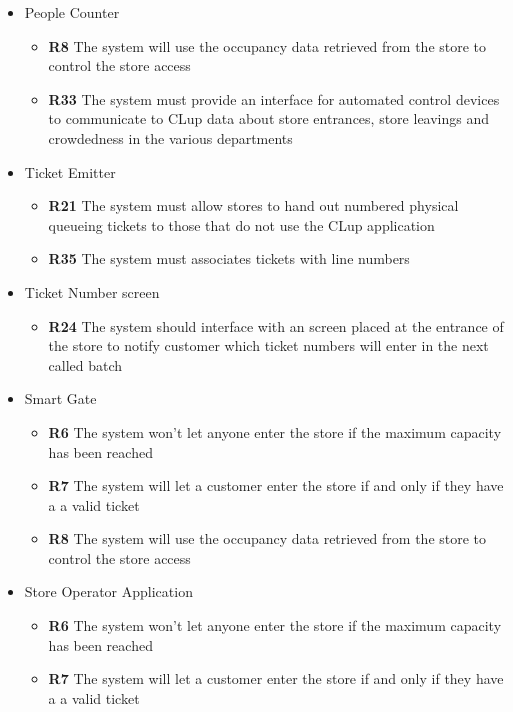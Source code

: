 \begin{itemize}
\begin{itemize}
    \end{itemize}
    \item People Counter
    \begin{itemize}
        \item \textbf{R8} The system will use the occupancy data retrieved from the store to control the store access
        \item \textbf{R33} The system must provide an interface for automated control devices to communicate to CLup data about store entrances, store leavings and crowdedness in the various departments
    \end{itemize}
    \item Ticket Emitter
    \begin{itemize}
        \item \textbf{R21} The system must allow stores to hand out numbered physical queueing tickets to those that do not use the CLup application
        \item \textbf{R35} The system must associates tickets with line numbers
    \end{itemize}
    \item Ticket Number screen
    \begin{itemize}
        \item \textbf{R24} The system should interface with an screen placed at the entrance of the store to notify customer which ticket numbers will enter in the next called batch
    \end{itemize}
    \item Smart Gate
    \begin{itemize}
        \item \textbf{R6} The system won’t let anyone enter the store if the maximum capacity has been reached
        \item \textbf{R7} The system will let a customer enter the store if and only if they have a a valid ticket
        \item \textbf{R8} The system will use the occupancy data retrieved from the store to control the store access
    \end{itemize}
    \item Store Operator Application
    \begin{itemize}
        \item \textbf{R6} The system won’t let anyone enter the store if the maximum capacity has been reached
        \item \textbf{R7} The system will let a customer enter the store if and only if they have a a valid ticket

\end{itemize}
\end{itemize}
